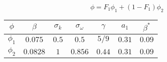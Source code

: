 \documentclass[10pt,xcolor=dvipsnames]{beamer}
\begin{document}
\begin{frame}
{\begin{columns}[c]
\begin{column}{0.50\textwidth}
\begin{equation}
                \phi = F_1 \phi_1 + (1 - F_1) \phi_2
            \end{equation}
            \scriptsize
            \begin{tabular}{|c|c|c|c|c|c|c|}
                \hline 
                $\phi$ & $\beta$ & $\sigma_k$ & $\sigma_\omega$ & $\gamma$ & $a_1$ & $\beta^*$ \\ 
                \hline 
                $\phi_1$ & $0.075$ & $0.5$ & $0.5$ & $5/9$ & $0.31$ & $0.09$ \\ 
                \hline 
                $\phi_2$ & $0.0828$ & $1$ & $0.856$ & $0.44$ & $0.31$ & $0.09$ \\ 
                \hline 
            \end{tabular} 
            \normalsize
        \end{column}
    \end{columns}
}
\end{frame}

\appendix
\renewcommand{\theframenumber}{\alph{framenumber}}

%     
%     

\end{document}
